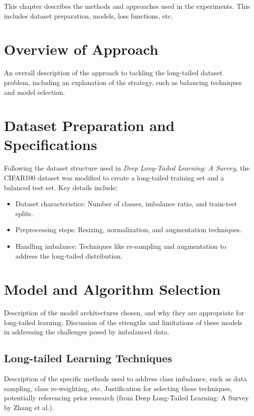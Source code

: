 
This chapter describes the methods and approaches used in the experiments. This includes dataset preparation, models, loss functions, etc.

\section{Overview of Approach}
An overall description of the approach to tackling the long-tailed dataset problem, including an explanation of the strategy, 
such as balancing techniques and model selection.

\section{Dataset Preparation and Specifications}
Following the dataset structure used in \textit{Deep Long-Tailed Learning: A Survey}, the CIFAR100 dataset was modified to create a long-tailed training set and a balanced test set. Key details include:

\begin{itemize}
    \item Dataset characteristics: Number of classes, imbalance ratio, and train-test splits.
    \item Preprocessing steps: Resizing, normalization, and augmentation techniques.
    \item Handling imbalance: Techniques like re-sampling and augmentation to address the long-tailed distribution.
\end{itemize}

\section{Model and Algorithm Selection}
Description of the model architectures chosen, and why they are appropriate for long-tailed learning.
Discussion of the strengths and limitations of these models in addressing the challenges posed by imbalanced data.

\subsection{Long-tailed Learning Techniques}
Description of the specific methods used to address class imbalance, such as data sampling, class re-weighting, etc. 
Justification for selecting these techniques, potentially referencing prior research (from Deep Long-Tailed Learning: A Survey by Zhang et al.).

